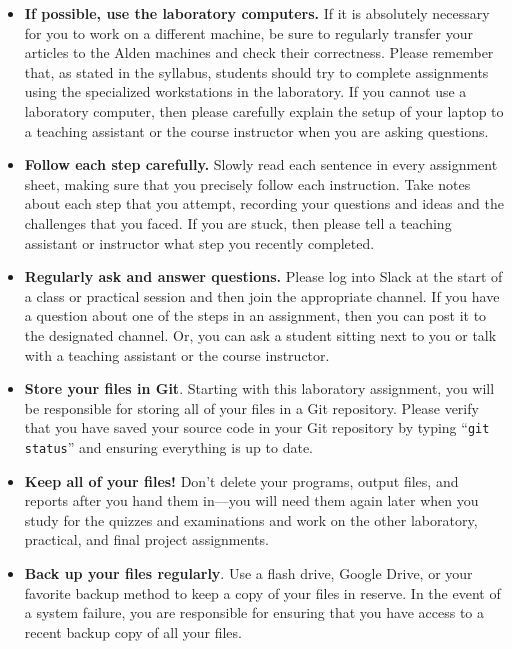 \vspace*{-.1in}
\begin{itemize}
  \setlength{\itemsep}{-.01in}

\item {\bf If possible, use the laboratory computers.} If it is absolutely necessary for you to work on a different
  machine, be sure to regularly transfer your articles to the Alden machines and check their correctness. Please
  remember that, as stated in the syllabus, students should try to complete assignments using the specialized
  workstations in the laboratory. If you cannot use a laboratory computer, then please carefully explain the setup of
  your laptop to a teaching assistant or the course instructor when you are asking questions.

\item {\bf Follow each step carefully.} Slowly read each sentence in every assignment sheet, making sure that you
  precisely follow each instruction. Take notes about each step that you attempt, recording your questions and ideas
  and the challenges that you faced. If you are stuck, then please tell a teaching assistant or instructor what step
  you recently completed.

\item {\bf Regularly ask and answer questions.} Please log into Slack at the start of a class or practical session and
  then join the appropriate channel. If you have a question about one of the steps in an assignment, then you can post
  it to the designated channel. Or, you can ask a student sitting next to you or talk with a teaching assistant or the
  course instructor.

\item {\bf Store your files in Git}. Starting with this laboratory assignment, you will be responsible for storing all
  of your files in a Git repository. Please verify that you have saved your source code in your Git repository by
  typing ``{\tt git status}'' and ensuring everything is up to date.

\item {\bf Keep all of your files!} Don't delete your programs, output files, and reports after you hand them in---you
  will need them again later when you study for the quizzes and examinations and work on the other laboratory,
  practical, and final project assignments.

\item {\bf Back up your files regularly}. Use a flash drive, Google Drive, or your favorite backup method to keep a
  copy of your files in reserve. In the event of a system failure, you are responsible for ensuring that you have
  access to a recent backup copy of all your files.

\end{itemize}

